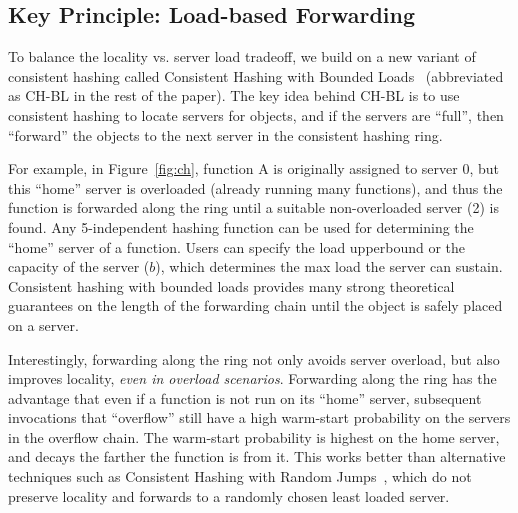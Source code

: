 
\subsection{Key Principle: Load-based Forwarding}
\label{subsec:key-principle}

To balance the locality vs. server load tradeoff, we build on a new variant of consistent hashing called Consistent Hashing with Bounded Loads~\cite{mirrokni2018consistent} (abbreviated as CH-BL in the rest of the paper).  
The key idea behind CH-BL is to use consistent hashing to locate servers for objects, and if the servers are ``full'', then ``forward'' the objects to the next server in the consistent hashing ring.

For example, in Figure~\ref{fig:ch}, function A is originally assigned to server 0, but this ``home'' server is overloaded (already running many functions), and thus the function is forwarded along the ring until a suitable non-overloaded server (2) is found. 
Any 5-independent hashing function can be used for determining the ``home'' server of a function. %
Users can specify the load upperbound or the capacity of the server ($b$), which determines the max load the server can sustain.  
Consistent hashing with bounded loads provides many strong theoretical guarantees on the length of the forwarding chain until the object is safely placed on a server. 

Interestingly, forwarding along the ring not only avoids server overload, but also improves locality, \emph{even in overload scenarios}.
Forwarding along the ring has the advantage that even if a function is not run on its ``home'' server, subsequent invocations that ``overflow'' still have a high warm-start probability on the servers in the overflow chain. %
The warm-start probability is highest on the home server, and decays the farther the function is from it. 
This works better than alternative techniques such as Consistent Hashing with Random Jumps~\cite{chrj-aaai21}, which do not preserve locality and forwards to a randomly chosen least loaded server. 

